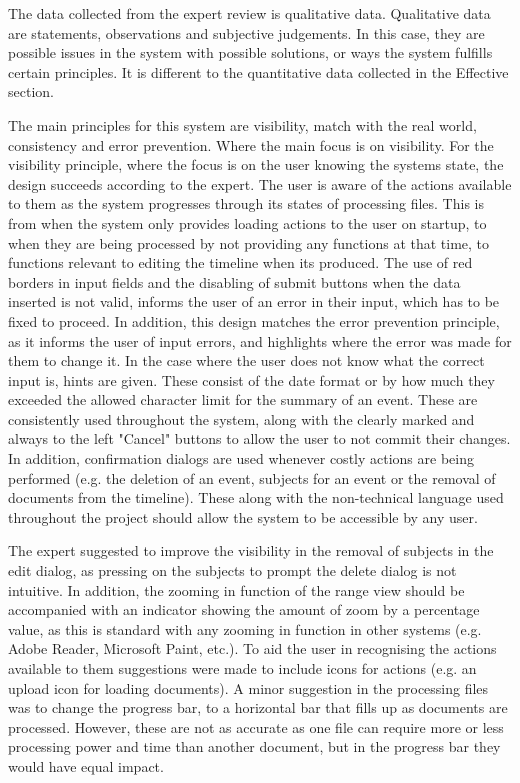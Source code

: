 \par The data collected from the expert review is qualitative data. Qualitative data are statements, observations and subjective judgements. In this case, they are possible issues in the system with possible solutions, or ways the system fulfills certain principles. It is different to the quantitative data collected in the Effective section.
\par The main principles for this system are visibility, match with the real world, consistency and error prevention. Where the main focus is on visibility. For the visibility principle, where the focus is on the user knowing the systems state, the design succeeds according to the expert. The user is aware of the actions available to them as the system progresses through its states of processing files. This is from when the system only provides loading actions to the user on startup, to when they are being processed by not providing any functions at that time, to functions relevant to editing the timeline when its produced. The use of red borders in input fields and the disabling of submit buttons when the data inserted is not valid, informs the user of an error in their input, which has to be fixed to proceed. In addition, this design matches the error prevention principle, as it informs the user of input errors, and highlights where the error was made for them to change it. In the case where the user does not know what the correct input is, hints are given. These consist of the date format or by how much they exceeded the allowed character limit for the summary of an event. These are consistently used throughout the system, along with the clearly marked and always to the left "Cancel" buttons to allow the user to not commit their changes. In addition, confirmation dialogs are used whenever costly actions are being performed (e.g. the deletion of an event, subjects for an event or the removal of documents from the timeline). These along with the non-technical language used throughout the project should allow the system to be accessible by any user.
\par The expert suggested to improve the visibility in the removal of subjects in the edit dialog, as pressing on the subjects to prompt the delete dialog is not intuitive. In addition, the zooming in function of the range view should be accompanied with an indicator showing the amount of zoom by a percentage value, as this is standard with any zooming in function in other systems (e.g. Adobe Reader, Microsoft Paint, etc.). To aid the user in recognising the actions available to them suggestions were made to include icons for actions (e.g. an upload icon for loading documents). A minor suggestion in the processing files was to change the progress bar, to a horizontal bar that fills up as documents are processed. However, these are not as accurate as one file can require more or less processing power and time than another document, but in the progress bar they would have equal impact.
